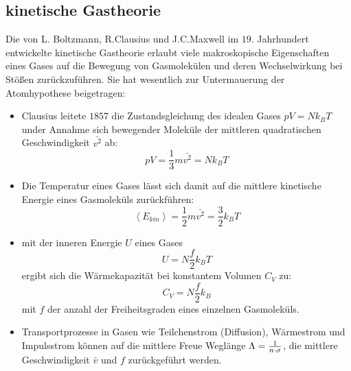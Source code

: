 \subsection{kinetische Gastheorie} %
\label{sub:kinetischer_Gastheorie}
Die von L. Boltzmann, R.Clausius und J.C.Maxwell im $19$. Jahrhundert
entwickelte kinetische Gastheorie erlaubt viele makroskopische Eigenschaften
eines Gases auf die Bewegung von Gasmolekülen und deren Wechselwirkung bei
Stößen zurückzuführen. Sie hat wesentlich zur Untermauerung der Atomhypothese
beigetragen:
\begin{itemize}
    \item Clausius leitete $1857$ die Zustandsgleichung des idealen Gases $pV=N
    k_B T$ under Annahme sich bewegender Moleküle der mittleren quadratischen
    Geschwindigkeit $\bar{v^2}$ ab: 
    \begin{equation*}
        pV = \frac{1}{3} m \bar{v^2} = N k_B T
    \end{equation*}
    \item Die Temperatur eines Gases lässt sich damit auf die mittlere
    kinetische Energie eines Gasmoleküls zurückführen:
    \begin{equation*}
        \left\langle E_{kin} \right\rangle
        =
        \frac{1}{2} m \bar{v^2} 
        =
        \frac{3}{2} k_B T
    \end{equation*}
    \item mit der inneren Energie $U$ eines Gases
    \begin{equation*}
        U = N \frac{f}{2} k_B T
    \end{equation*}
    ergibt sich die Wärmekapazität bei konstantem Volumen $C_V$ zu:
    \begin{equation*}
        C_V = N \frac{f}{2} k_B
    \end{equation*}
    mit $f$ der anzahl der Freiheitsgraden eines einzelnen Gasmoleküls.
    \item Transportprozesse in Gasen wie Teilchenstrom (Diffusion), Wärmestrom
    und Impulsstrom können auf die mittlere Freue Weglänge $\Lambda =
    \frac{1}{n \cdot \sigma}$, die mittlere Geschwindigkeit $\bar{v}$ und $f$
    zurückgeführt werden.
\end{itemize}


